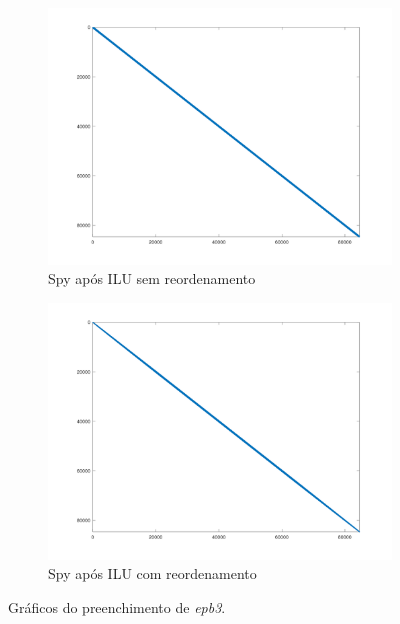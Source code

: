 \begin{figure}[H]
    \begin{subfigure}[t]{0.4\linewidth}
         \centering
         \includegraphics[width=\textwidth]{images/epb3_spyM_ILU_sem.png}
         \caption{Spy após ILU sem reordenamento}
         \label{fig:epb-ILU-s}
    \end{subfigure}
    \quad
    \begin{subfigure}[t]{0.4\linewidth}
         \centering
         \includegraphics[width=\textwidth]{images/epb3_spyM_ILU_com.png}
         \caption{Spy após ILU com reordenamento}
         \label{fig:epb-ILU-c}
    \end{subfigure}
    \caption{Gráficos do preenchimento de \textit{epb3}.}
    \label{fig:epb}
\end{figure}
